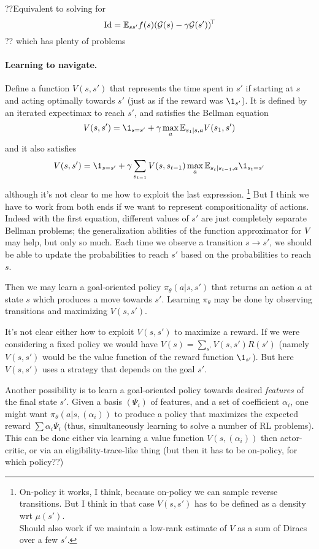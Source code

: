\documentclass[11pt,a4paper]{article}
\newcommand{\green}{\mathcal{G}}
\begin{document}
??Equivalent to solving for
\begin{equation}
\Id=\E_{ss'} f(s)\transp{(\green(s)-\gamma
\green(s'))}
\end{equation}
?? which has plenty of problems

\paragraph{Learning to navigate.} Define a function $V(s,s')$ that
represents the time spent in $s'$ if starting at $s$ and acting optimally
towards $s'$ (just as if the reward was $\1_{s'}$). It is defined by an iterated expectimax to reach $s'$, and
satisfies the Bellman equation
\begin{equation}
V(s,s')=\1_{s=s'}+\gamma \max_a \E_{s_1|s,a} V(s_1,s')
\end{equation}
and it also satisfies
\begin{equation}
V(s,s')=\1_{s=s'}+\gamma \sum_{s_{t-1}} V(s,s_{t-1})\max_a
\E_{s_t|s_{t-1},a}\1_{s_t=s'}
\end{equation}
although it's not clear to me how to exploit the last expression. 
\footnote{On-policy it works, I think, because on-policy we can sample
reverse transitions. But I think in that case $V(s,s')$ has to be defined
as a density wrt $\mu(s')$.\\Should also work if we maintain a low-rank
estimate of $V$ as a sum of Diracs over a few $s'$.}
But I
think we have to work from both ends if we want to represent
compositionality of actions. Indeed with the first equation, different values
of $s'$ are just completely separate Bellman problems; the generalization
abilities of the function approximator for $V$ may help, but only so
much. Each time we observe a transition $s\to s'$, we should be able to
update the probabilities to reach $s'$ based on the probabilities to
reach $s$.

Then we may learn a goal-oriented policy $\pi_\theta(a|s,s')$ that returns an
action $a$ at state $s$ which produces a move towards $s'$. Learning
$\pi_\theta$ may be done by observing transitions and maximizing
$V(s,s')$.

It's not clear either how to exploit $V(s,s')$ to maximize a reward. If
we were considering a fixed policy we would have
$V(s)=\sum_{s'}V(s,s')R(s')$ (namely $V(s,s')$ would be the value
function of the reward function $\1_{s'}$). But here $V(s,s')$ uses a
strategy that depends on the goal $s'$.

Another possibility is to learn a goal-oriented policy towards desired
\emph{features} of the final state $s'$. Given a basis $(\Psi_i)$ of
features, and a set of coefficient $\alpha_i$, one might want
$\pi_\theta(a|s,(\alpha_i))$ to produce a policy that maximizes the
expected reward $\sum \alpha_i \Psi_i$ (thus, simultaneously learning to
solve a number of RL problems). 
This can be done either via learning a value function $V(s,(\alpha_i))$
then actor-critic, or via an eligibility-trace-like thing (but then it
has to be on-policy, for which policy??)
\end{document}
